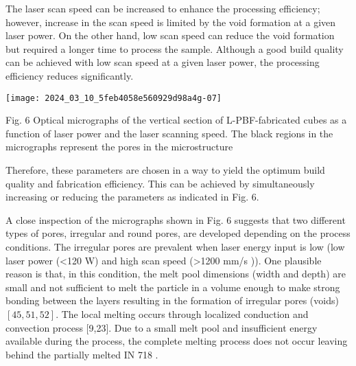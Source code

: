 \documentclass[10pt]{article}
\begin{document}
The laser scan speed can be increased to enhance the processing efficiency; however, increase in the scan speed is limited by the void formation at a given laser power. On the other hand, low scan speed can reduce the void formation but required a longer time to process the sample. Although a good build quality can be achieved with low scan speed at a given laser power, the processing efficiency reduces significantly.

\begin{center}
\texttt{[image: 2024\_03\_10\_5feb4058e560929d98a4g-07]}
\end{center}

Fig. 6 Optical micrographs of the vertical section of L-PBF-fabricated cubes as a function of laser power and the laser scanning speed. The black regions in the micrographs represent the pores in the microstructure

Therefore, these parameters are chosen in a way to yield the optimum build quality and fabrication efficiency. This can be achieved by simultaneously increasing or reducing the parameters as indicated in Fig. 6.

A close inspection of the micrographs shown in Fig. 6 suggests that two different types of pores, irregular and round pores, are developed depending on the process conditions. The irregular pores are prevalent when laser energy input is low (low laser power (<120 W) and high scan speed (>1200 mm/s )). One plausible reason is that, in this condition, the melt pool dimensions (width and depth) are small and not sufficient to melt the particle in a volume enough to make strong bonding between the layers resulting in the formation of irregular pores (voids) $[45,51,52]$. The local melting occurs through localized conduction and convection process [9,23]. Due to a small melt pool and insufficient energy available during the process, the complete melting process does not occur leaving behind the partially melted IN 718 .
\end{document}
